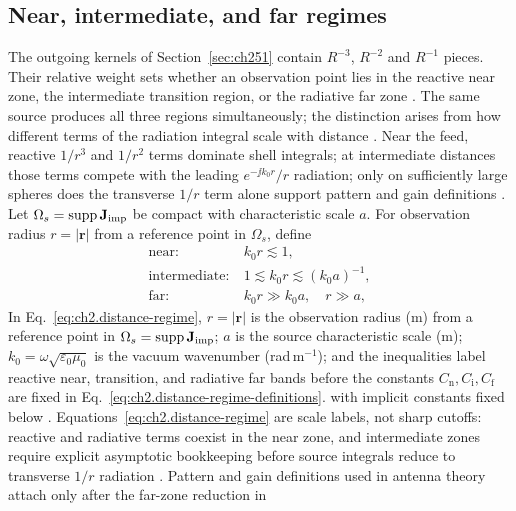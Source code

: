 \subsection{Near, intermediate, and far regimes}
\label{sec:ch252}

The outgoing kernels of Section~\ref{sec:ch251} contain $R^{-3}$, $R^{-2}$ and $R^{-1}$ pieces.
Their relative weight sets whether an observation point lies in the reactive near zone, the
intermediate transition region, or the radiative far zone \cite{stratton1941,jackson1999}.
The same source produces all three regions simultaneously; the distinction arises from how
different terms of the radiation integral scale with distance \cite{stratton1941}. Near the
feed, reactive \(1/r^{3}\) and \(1/r^{2}\) terms dominate shell integrals; at intermediate
distances those terms compete with the leading \(e^{-\jj k_0 r}/r\) radiation; only on
sufficiently large spheres does the transverse \(1/r\) term alone support pattern and gain
definitions \cite{harrington2001}.
Let \(\Omega_s=\operatorname{supp}\mathbf{J}_{\mathrm{imp}}\) be compact with characteristic scale \(a\). For
observation radius \(r=|\mathbf{r}|\) from a reference point in \(\Omega_s\), define
\begin{equation}
\label{eq:ch2.distance-regime}
\begin{aligned}
\text{near:}\ & k_0 r\lesssim 1,\\
\text{intermediate:}\ & 1\lesssim k_0 r\lesssim (k_0 a)^{-1},\\
\text{far:}\ & k_0 r\gg k_0 a,\quad r\gg a,
\end{aligned}
\end{equation}
In Eq.~\eqref{eq:ch2.distance-regime},
\(r=|\mathbf{r}|\) is the observation radius (m) from a reference point in
\(\Omega_s=\operatorname{supp}\mathbf{J}_{\mathrm{imp}}\);
\(a\) is the source characteristic scale (m);
\(k_0=\omega\sqrt{\varepsilon_0\mu_0}\) is the vacuum wavenumber (rad\,m\(^{-1}\)); and
the inequalities label reactive near, transition, and radiative far bands before the
constants \(C_{\mathrm{n}},C_{\mathrm{i}},C_{\mathrm{f}}\) are fixed in
Eq.~\eqref{eq:ch2.distance-regime-definitions}.
with implicit constants fixed below \cite{stratton1941}. Equations~\eqref{eq:ch2.distance-regime}
are scale labels, not sharp cutoffs: reactive and radiative terms coexist in the near zone, and
intermediate zones require explicit asymptotic bookkeeping before source integrals reduce to
transverse \(1/r\) radiation \cite{harrington2001}. Pattern and gain definitions used in antenna
theory attach only after the far-zone reduction in
